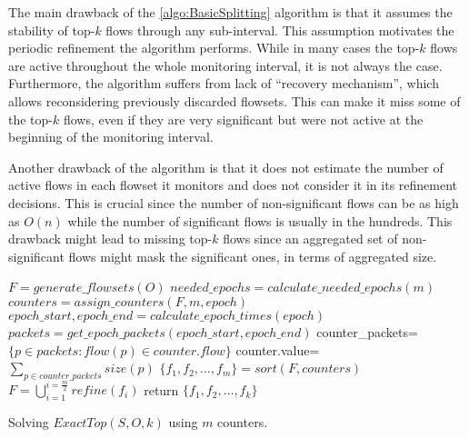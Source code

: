 The main drawback of the \ref{algo:BasicSplitting} algorithm is that it assumes the stability of top-$k$ flows through any sub-interval. This assumption motivates the periodic refinement the algorithm performs.
While in many cases the top-$k$ flows are active throughout the whole monitoring interval, it is not always the case. Furthermore, the algorithm suffers from lack of ``recovery mechanism'', which allows reconsidering previously discarded flowsets. This can make it miss some of the top-$k$ flows, even if they are very significant but were not active at the beginning of the monitoring interval.

Another drawback of the algorithm is that it does not estimate the number of active flows in each flowset it monitors and does not consider it in its refinement decisions. This is crucial since the number of non-significant flows can be as high as $O(n)$ while the number of significant flows is usually in the hundreds. This drawback might lead to missing top-$k$ flows since an aggregated set of non-significant flows might mask the significant ones, in terms of aggregated size.

\begin{algorithm}
    $F = generate\_flowsets(O)$\;
    $needed\_epochs=calculate\_needed\_epochs(m)$\;
    {
        $counters=assign\_counters(F, m, epoch)$\;
        $epoch\_start, epoch\_end=calculate\_epoch\_times(epoch)$\;
        $packets=get\_epoch\_packets(epoch\_start, epoch\_end)$\;
         {
            counter\_packets=$\{p\in packets : flow(p)\in counter.flow\}$\;
            counter.value=$\sum_{p\in counter\_packets}size(p)$\;
        }
        $\{f_1,f_2,\dots,f_m\}=sort(F, counters)$\;
        $F=\bigcup_{i=1}^{i=\frac{m}{2}}refine(f_i)$\;
    }
    return $\{f_1,f_2,\dots,f_k\}$
    \caption{Solving $ExactTop(S,O,k)$ using $m$ counters.}
    \label{algo:BasicSplitting}
\end{algorithm}
